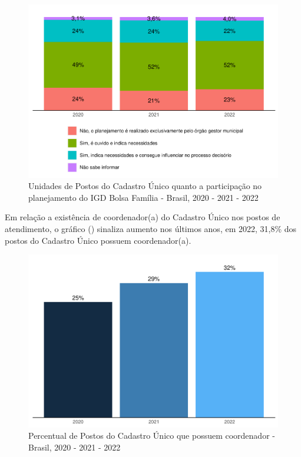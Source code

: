 \documentclass[
  brazilian]{report}
\begin{document}
\begin{figure}
\includegraphics{Censo-SUAS-2022_files/figure-latex/igdbolsa-1} \caption[Unidades de Postos do Cadastro Único quanto a participação no planejamento do IGD Bolsa Família - Brasil, 2020 - 2021 - 2022]{Unidades de Postos do Cadastro Único quanto a participação no planejamento do IGD Bolsa Família - Brasil, 2020 - 2021 - 2022}\label{fig:igdbolsa}
\end{figure}

Em relação a existência de coordenador(a) do Cadastro Único nos postos
de atendimento, o gráfico () sinaliza aumento
nos últimos anos, em 2022, 31,8\% dos postos do Cadastro Único possuem
coordenador(a).

\begin{figure}
\includegraphics{Censo-SUAS-2022_files/figure-latex/coord_cadunico-1} \caption[Percentual de Postos do Cadastro Único que possuem coordenador - Brasil, 2020 - 2021 - 2022]{Percentual de Postos do Cadastro Único que possuem coordenador - Brasil, 2020 - 2021 - 2022}\label{fig:coord_cadunico}
\end{figure}
\end{document}
